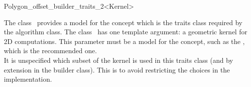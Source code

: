 

\begin{ccRefClass}{Polygon_offset_builder_traits_2<Kernel>}


\ccDefinition

The class \ccRefName\ provides a model for the
 concept which is the traits class
required by the  algorithm class. The class 
\ccRefName\ has one template argument: a geometric kernel for 2D computations. This parameter must be a model for the  concept, such as the , which is the recommended one.\\
It is unspecified which subset of the kernel is used in this traits class (and by extension in the builder class). This is to avoid restricting the choices in the implementation.


\ccIsModel
{}\\
\\
\\

\ccSeeAlso
{}

\end{ccRefClass}


